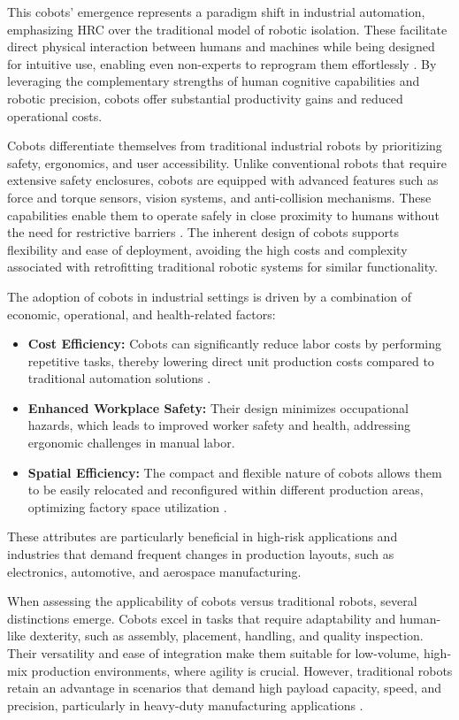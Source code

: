 This cobots' emergence represents a paradigm shift in industrial automation, emphasizing \ac{HRC} over the traditional model of robotic isolation. These facilitate direct physical interaction between humans and machines while being designed for intuitive use, enabling even non-experts to reprogram them effortlessly \cite{7140065}. By leveraging the complementary strengths of human cognitive capabilities and robotic precision, cobots offer substantial productivity gains and reduced operational costs.

Cobots differentiate themselves from traditional industrial robots by prioritizing safety, ergonomics, and user accessibility. Unlike conventional robots that require extensive safety enclosures, cobots are equipped with advanced features such as force and torque sensors, vision systems, and anti-collision mechanisms. These capabilities enable them to operate safely in close proximity to humans without the need for restrictive barriers \cite{cobots-design}. The inherent design of cobots supports flexibility and ease of deployment, avoiding the high costs and complexity associated with retrofitting traditional robotic systems for similar functionality.

The adoption of cobots in industrial settings is driven by a combination of economic, operational, and health-related factors:
\begin{itemize}
    \item \textbf{Cost Efficiency:} Cobots can significantly reduce labor costs by performing repetitive tasks, thereby lowering direct unit production costs compared to traditional automation solutions \cite{cobot-2019collaborative}.
    \item \textbf{Enhanced Workplace Safety:} Their design minimizes occupational hazards, which leads to improved worker safety and health, addressing ergonomic challenges in manual labor.
    \item \textbf{Spatial Efficiency:} The compact and flexible nature of cobots allows them to be easily relocated and reconfigured within different production areas, optimizing factory space utilization \cite{cobots-implementation}.
\end{itemize}


These attributes are particularly beneficial in high-risk applications and industries that demand frequent changes in production layouts, such as electronics, automotive, and aerospace manufacturing.

When assessing the applicability of cobots versus traditional robots, several distinctions emerge. Cobots excel in tasks that require adaptability and human-like dexterity, such as assembly, placement, handling, and quality inspection. Their versatility and ease of integration make them suitable for low-volume, high-mix production environments, where agility is crucial. However, traditional robots retain an advantage in scenarios that demand high payload capacity, speed, and precision, particularly in heavy-duty manufacturing applications \cite{robotics8040100}.

